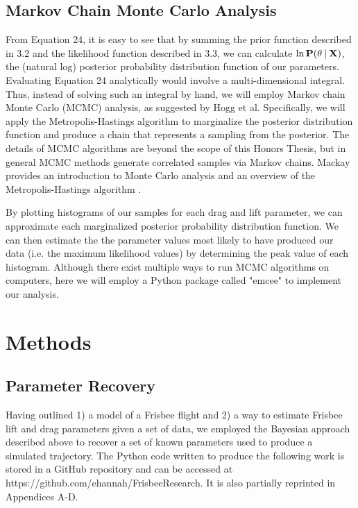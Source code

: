 \documentclass[a4paper,12pt, oneside]{article}
\newcommand\givenbase[1][]{\:#1\lvert\:}
\let\given\givenbase
\begin{document}
\subsection{Markov Chain Monte Carlo Analysis}
From Equation 24, it is easy to see that by summing the prior function described in 3.2 and the likelihood function described in 3.3, we can calculate $\ln\bold{P}(\theta\given\bold{X})$, the (natural log) posterior probability distribution function of our parameters. Evaluating Equation 24 analytically would involve a multi-dimensional integral. Thus, instead of solving such an integral by hand, we will employ Markov chain Monte Carlo (MCMC) analysis, as suggested by Hogg et al. Specifically, we will apply the Metropolis-Hastings algorithm to marginalize the posterior distribution function and produce a chain that represents a sampling from the posterior. The details of MCMC algorithms are beyond the scope of this Honors Thesis, but in general MCMC methods generate correlated samples via Markov chains. Mackay provides an introduction to Monte Carlo analysis and an overview of the Metropolis-Hastings algorithm \cite{mackay}. 

By plotting histograms of our samples for each drag and lift parameter, we can approximate each marginalized posterior probability distribution function. We can then estimate the the parameter values most likely to have produced our data (i.e. the maximum likelihood values) by determining the peak value of each histogram. Although there exist multiple ways to run MCMC algorithms on computers, here we will employ a Python package called "emcee" to implement our analysis.
\section{Methods}
\subsection{Parameter Recovery}
Having outlined 1) a model of a Frisbee flight and 2) a way to estimate Frisbee lift and drag parameters given a set of data, we employed the Bayesian approach described above to recover a set of known parameters used to produce a simulated trajectory. The Python code written to produce the following work is stored in a GitHub repository and can be accessed at https://github.com/ehannah/FrisbeeResearch. It is also partially reprinted in Appendices A-D. 
\end{document}
